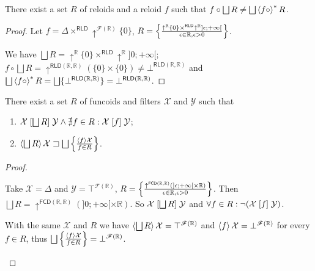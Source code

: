 \begin{example}
There exist a set $R$ of reloids and a reloid $f$ such that $f\circ\bigsqcup R\neq\bigsqcup\rsupfun{f\circ}R$.\end{example}
\begin{proof}
Let $f=\Delta\times^{\mathsf{RLD}}\uparrow^{\mathscr{F}(\mathbb{R})}\{0\}$,
$R=\left\{ \frac{\uparrow^{\mathbb{R}}\{0\}\times^{\mathsf{RLD}}\uparrow^{\mathbb{R}}]\epsilon;+\infty[}{\epsilon\in\mathbb{R},\epsilon>0}\right\}$.

We have $\bigsqcup R=\uparrow^{\mathbb{R}}\{0\}\times^{\mathsf{RLD}}\uparrow^{\mathbb{R}}]0;+\infty[$;
$f\circ\bigsqcup R=\uparrow^{\mathsf{RLD}(\mathbb{R},\mathbb{R})}(\{0\}\times\{0\})\ne\bot^{\mathsf{RLD}(\mathbb{R},\mathbb{R})}$
and $\bigsqcup\rsupfun{f\circ}R=\bigsqcup\{\bot^{\mathsf{RLD}(\mathbb{R},\mathbb{R})}\}=\bot^{\mathsf{RLD}(\mathbb{R},\mathbb{R})}$.\end{proof}
\begin{example}
There exist a set $R$ of funcoids and filters $\mathcal{X}$ and
$\mathcal{Y}$ such that
\begin{enumerate}
\item \label{count-join-rel}$\mathcal{X}\suprel{\bigsqcup R}\mathcal{Y}\land\nexists f\in R:\mathcal{X}\suprel f\mathcal{Y}$;
\item \label{count-join-fun}$\supfun{\bigsqcup R}\mathcal{X}\sqsupset\bigsqcup\setcond{\supfun f\mathcal{X}}{f\in R}$.
\end{enumerate}
\end{example}
\begin{proof}
~
\begin{widedisorder}
\item [{\ref{count-join-rel}}] Take $\mathcal{X}=\Delta$ and $\mathcal{Y}=\top^{\mathscr{F}(\mathbb{R})}$,
$R=\left\{ \frac{\uparrow^{\mathsf{FCD}(\mathbb{R},\mathbb{R})}(]\epsilon;+\infty[\times\mathbb{R})}{\epsilon\in\mathbb{R},\epsilon>0}\right\}$.
Then $\bigsqcup R=\uparrow^{\mathsf{FCD}(\mathbb{R},\mathbb{R})}(]0;+\infty[\times\mathbb{R})$.
So $\mathcal{X}\suprel{\bigsqcup R}\mathcal{Y}$ and $\forall f\in R:\lnot(\mathcal{X}\mathrel{\left[f\right]}\mathcal{Y})$.
\item [{\ref{count-join-fun}}] With the same $\mathcal{X}$ and $R$ we
have $\supfun{\bigsqcup R}\mathcal{X}=\top^{\mathscr{F}(\mathbb{R})}$
and $\left\langle f\right\rangle\mathcal{X}=\bot^{\mathscr{F}(\mathbb{R})}$ for every
$f\in R$, thus $\bigsqcup\setcond{\supfun f\mathcal{X}}{f\in R}=\bot^{\mathscr{F}(\mathbb{R})}$.
\end{widedisorder}
\end{proof}
